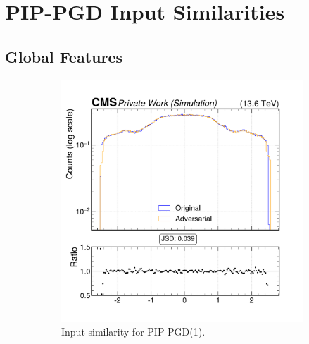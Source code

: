 \section{PIP-PGD Input Similarities}
\label{appendix:combined}

\FloatBarrier
\subsection*{Global Features}

\begin{figure}[h]
  \centering
  \begin{subfigure}[t]{0.32\textwidth}
    \includegraphics[width=\linewidth]{media/output/features/compare/combined_it_1/cmp_global_features_jet_eta.pdf}
    \caption*{Input similarity for PIP-PGD(1).}
  \end{subfigure}\hfill
  \begin{subfigure}[t]{0.32\textwidth}

\end{subfigure}
\end{figure}
